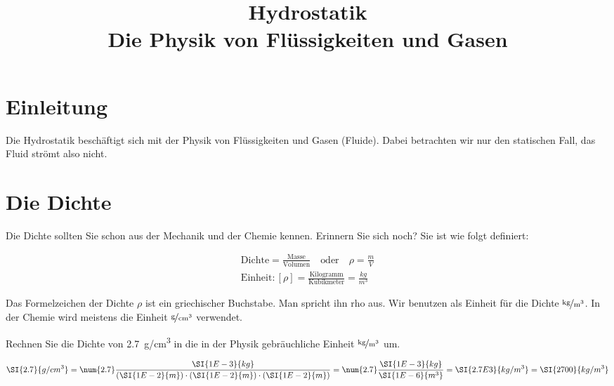 \documentclass[12pt,a4paper,twoside]{article}
\date{}
\title{Hydrostatik\\{\large Die Physik von Flüssigkeiten und Gasen}}
\begin{document}
\maketitle



\section*{Einleitung}
Die Hydrostatik beschäftigt sich mit der Physik von Flüssigkeiten und Gasen (Fluide).
Dabei betrachten wir nur den statischen Fall, das Fluid strömt also nicht.

\section*{Die Dichte}
Die Dichte sollten Sie schon aus der Mechanik und der Chemie kennen. 
Erinnern Sie sich noch?
Sie ist wie folgt definiert:

\begin{cbox}
\begin{gather*}
	\text{Dichte} = \frac{\text{Masse}}{\text{Volumen}} \quad\text{oder}\quad \rho = \frac{m}{V}\\
	\text{Einheit}: [\rho]=\frac{\text{Kilogramm}}{\text{Kubikmeter}}=\frac{\si{kg}}{\si{m^3}}
\end{gather*}
\end{cbox}

Das Formelzeichen der Dichte $\rho$ ist ein griechischer Buchstabe. Man spricht ihn rho aus.
Wir benutzen als Einheit für die Dichte $\nicefrac{\textrm{kg}}{\textrm{m}^3}$. In der Chemie wird meistens die
Einheit $\nicefrac{\textrm{g}}{\textrm{cm}^3}$ verwendet.

\begin{aufgabe}
	Rechnen Sie die Dichte von \SI{2.7}{g/cm^3} in die in der Physik gebräuchliche Einheit $\nicefrac{\textrm{kg}}{\textrm{m}^3}$ um.


	\begin{loesung}
		\begin{eqnarray*}
			\SI{2.7}{g/cm^3} = \num{2.7}\frac{\SI{1E-3}{kg}}{(\SI{1E-2}{m})\cdot(\SI{1E-2}{m})\cdot(\SI{1E-2}{m})}=\num{2.7}\frac{\SI{1E-3}{kg}}{\SI{1E-6}{m^3}}=\SI{2.7E3}{kg/m^3}=\SI{2700}{kg/m^3}
		\end{eqnarray*}
	\end{loesung}

\end{aufgabe}
\end{document}
